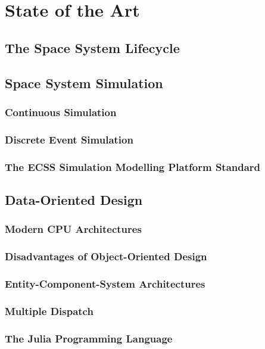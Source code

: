\chapter{State of the Art}
\label{sec:state-of-the-art}

\section{The Space System Lifecycle}
\label{sec:space-system-lifecycle}

\section{Space System Simulation}
\label{sec:space-system-simulation}

\subsection{Continuous Simulation}
\label{sec:continuous-simulation}

\subsection{Discrete Event Simulation}
\label{sec:discrete-event-simulation}

\subsection{The ECSS Simulation Modelling Platform Standard}
\label{sec:ecss-smp}

\section{Data-Oriented Design}
\label{sec:data-oriented-design}

\subsection{Modern CPU Architectures}
\label{sec:modern-cpu-architectures}

\subsection{Disadvantages of Object-Oriented Design}
\label{sec:disadvantages-oop}

\subsection{Entity-Component-System Architectures}
\label{sec:ecs-architectures}

\subsection{Multiple Dispatch}
\label{sec:multiple-dispatch}

\subsection{The Julia Programming Language}
\label{sec:julia}

